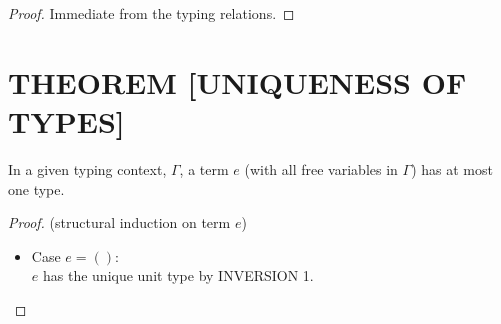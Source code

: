 \documentclass{article}
\begin{document}
\begin{proof}
  Immediate from the typing relations.
\end{proof}


\section{THEOREM [UNIQUENESS OF TYPES]}
In a given typing context, $\Gamma$, a term $e$ (with all free variables in $\Gamma$) has at most one type.

\begin{proof} (structural induction on term $e$)
  \begin{itemize}
  \item Case $e = ()$:\\
    $e$ has the unique unit type by INVERSION 1.
    
  \end{itemize}
\end{proof}

  
\end{document}

